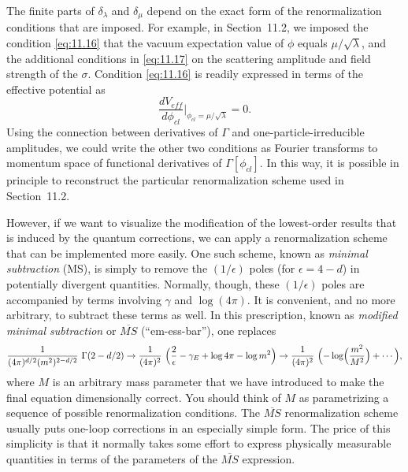 The finite parts of $\delta_\lambda$ and $\delta_\mu$ depend on the exact form
of the renormalization conditions that are imposed.  For example, in
Section~11.2, we imposed the condition \eqref{eq:11.16} that the vacuum
expectation value of $\phi$ equals $\mu/\sqrt{\lambda}$, and the additional
conditions in \eqref{eq:11.17} on the scattering amplitude and field strength
of the $\sigma$.  Condition \eqref{eq:11.16} is readily expressed in terms of
the effective potential as
\begin{equation}
  \frac{dV_{eff}}{d\phi_{cl}}\Big|_{\phi_{cl} = \mu/\sqrt{\lambda}} = 0 .
\end{equation}
Using the connection between derivatives of $\Gamma$ and
one-particle-irreducible amplitudes, we could write the other two conditions
as Fourier transforms to momentum space of functional derivatives of
$\Gamma[\phi_{cl}]$.  In this way, it is possible in principle to reconstruct
the particular renormalization scheme used in Section~11.2.

However, if we want to visualize the modification of the lowest-order results
that is induced by the quantum corrections, we can apply a renormalization
scheme that can be implemented more easily.  One such scheme, known as
\emph{minimal subtraction} (MS), is simply to remove the $(1/\epsilon)$ poles
(for $\epsilon = 4-d$) in potentially divergent quantities.  Normally, though,
these $(1/\epsilon)$ poles are accompanied by terms involving $\gamma$ and
$\log(4\pi)$.  It is convenient, and no more arbitrary, to subtract these
terms as well.  In this prescription, known as \emph{modified minimal
subtraction} or $\overline{MS}$ (``em-ess-bar''), one replaces
\begin{equation}
  \frac{1}{(4\pi)^{d/2}(m^2)^{2-d/2}}\ \Gamma(2-d/2)
  \to \frac{1}{(4\pi)^2}\ \Bigl( \frac{2}{\epsilon} - \gamma_E
    + \log 4\pi - \log m^2 \Bigr)
  \to \frac{1}{(4\pi)^2}\ \Bigl( -\log\Bigl( \frac{m^2}{M^2} \Bigr)
    + \cdots \Bigr),
  \label{eq:11.77}
\end{equation}
where $M$ is an arbitrary mass parameter that we have introduced to make the
final equation dimensionally correct.  You should think of $M$ as
parametrizing a sequence of possible renormalization conditions.  The
$\overline{MS}$ renormalization scheme usually puts one-loop corrections in an
especially simple form.  The price of this simplicity is that it normally
takes some effort to express physically measurable quantities in terms of the
parameters of the $\overline{MS}$ expression.

